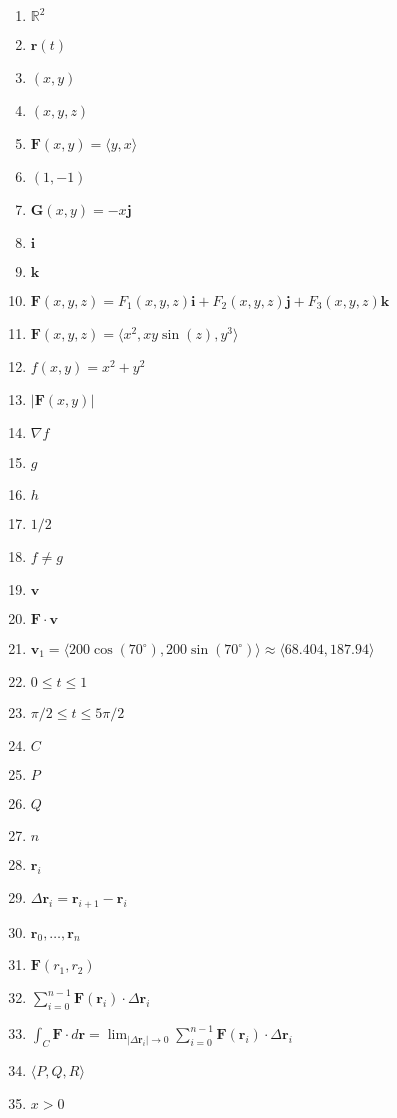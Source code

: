 \documentclass[oneside,10pt,]{article}
\title{}
\date{}
\newcommand{\R}{\mathbb{R}}
\newcommand{\vi}{\mathbf{i}}
\newcommand{\vj}{\mathbf{j}}
\newcommand{\vk}{\mathbf{k}}
\newcommand{\vr}{\mathbf{r}}
\newcommand{\vv}{\mathbf{v}}
\newcommand{\vF}{\mathbf{F}}
\newcommand{\vG}{\mathbf{G}}
\newcommand{\vecmag}[1]{|#1|}
\newcommand{\grad}{\nabla}
\begin{document}
\hypertarget{g:article:idp1}{}
%
\begin{enumerate}
\item{}\(\R^2\)%
\item{}\(\vr(t)\)%
\item{}\((x,y)\)%
\item{}\((x,y,z)\)%
\item{}\(\vF(x,y) = \langle y,x\rangle\)%
\item{}\((1,-1)\)%
\item{}\(\vG(x,y) = -x\vj\)%
\item{}\(\vi\)%
\item{}\(\vk\)%
\item{}\(\vF(x,y,z) = F_1(x,y,z)\vi + F_2(x,y,z)\vj + F_3(x,y,z)\vk\)%
\item{}\(\vF(x,y,z) = \langle x^2,xy\sin(z),y^3\rangle\)%
\item{}\(f(x,y) = x^2 +
y^2\)%
\item{}\(\vecmag{\vF(x,y)}\)%
\item{}\(\grad{f}\)%
\item{}\(g\)%
\item{}\(h\)%
\item{}\(1/2\)%
\item{}\(f\neq g\)%
\item{}\(\vv\)%
\item{}\(\vF\cdot \vv\)%
\item{}\(\vv_1 = \langle
200\cos(70^\circ),200\sin(70^\circ)\rangle \approx
\langle 68.404,187.94\rangle\)%
\item{}\(0\leq t\leq 1\)%
\item{}\(\pi/2\leq t \leq 5\pi/2\)%
\item{}\(C\)%
\item{}\(P\)%
\item{}\(Q\)%
\item{}\(n\)%
\item{}\(\vr_i\)%
\item{}\(\Delta\vr_i =
\vr_{i+1}-\vr_i\)%
\item{}\(\vr_0,\dots,\vr_n\)%
\item{}\(\vF(r_1,r_2)\)%
\item{}\(\sum_{i=0}^{n-1}\vF(\vr_i)\cdot\Delta \vr_i\)%
\item{}\(\int_C \vF\cdot d\vr = \lim_{|\Delta\vr_i|\to 0}
\sum_{i=0}^{n-1}\vF(\vr_i)\cdot\Delta\vr_i\)%
\item{}\(\langle P, Q,
R\rangle\)%
\item{}\(x>0\)%

\end{enumerate}
\end{document}
